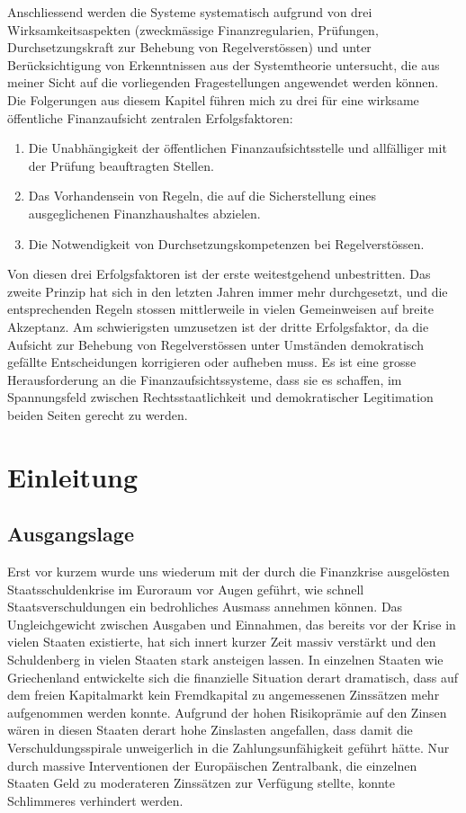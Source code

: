 \documentclass[10pt]{article}
\begin{document}
Anschliessend werden die Systeme systematisch aufgrund von drei Wirksamkeitsaspekten (zweckmässige Finanzregularien, Prüfungen, Durchsetzungskraft zur Behebung von Regelverstössen) und unter Berücksichtigung von Erkenntnissen aus der Systemtheorie untersucht, die aus meiner Sicht auf die vorliegenden Fragestellungen angewendet werden können. Die Folgerungen aus diesem Kapitel führen mich zu drei für eine wirksame öffentliche Finanzaufsicht zentralen Erfolgsfaktoren:

\begin{enumerate}
    \item Die Unabhängigkeit der öffentlichen Finanzaufsichtsstelle und allfälliger mit der Prüfung beauftragten Stellen.

    \item Das Vorhandensein von Regeln, die auf die Sicherstellung eines ausgeglichenen Finanzhaushaltes abzielen.

    \item Die Notwendigkeit von Durchsetzungskompetenzen bei Regelverstössen.

\end{enumerate}

Von diesen drei Erfolgsfaktoren ist der erste weitestgehend unbestritten. Das zweite Prinzip hat sich in den letzten Jahren immer mehr durchgesetzt, und die entsprechenden Regeln stossen mittlerweile in vielen Gemeinweisen auf breite Akzeptanz. Am schwierigsten umzusetzen ist der dritte Erfolgsfaktor, da die Aufsicht zur Behebung von Regelverstössen unter Umständen demokratisch gefällte Entscheidungen korrigieren oder aufheben muss. Es ist eine grosse Herausforderung an die Finanzaufsichtssysteme, dass sie es schaffen, im Spannungsfeld zwischen Rechtsstaatlichkeit und demokratischer Legitimation beiden Seiten gerecht zu werden.

\newpage
\section{Einleitung}\label{sec:einleitung}
\subsection{Ausgangslage}\label{subsec:ausgangslage}
Erst vor kurzem wurde uns wiederum mit der durch die Finanzkrise ausgelösten Staatsschuldenkrise im Euroraum vor Augen geführt, wie schnell Staatsverschuldungen ein bedrohliches Ausmass annehmen können. Das Ungleichgewicht zwischen Ausgaben und Einnahmen, das bereits vor der Krise in vielen Staaten existierte, hat sich innert kurzer Zeit massiv verstärkt und den Schuldenberg in vielen Staaten stark ansteigen lassen. In einzelnen Staaten wie Griechenland entwickelte sich die finanzielle Situation derart dramatisch, dass auf dem freien Kapitalmarkt kein Fremdkapital zu angemessenen Zinssätzen mehr aufgenommen werden konnte. Aufgrund der hohen Risikoprämie auf den Zinsen wären in diesen Staaten derart hohe Zinslasten angefallen, dass damit die Verschuldungsspirale unweigerlich in die Zahlungsunfähigkeit geführt hätte. Nur durch massive Interventionen der Europäischen Zentralbank, die einzelnen Staaten Geld zu moderateren Zinssätzen zur Verfügung stellte, konnte Schlimmeres verhindert werden.
\end{document}
